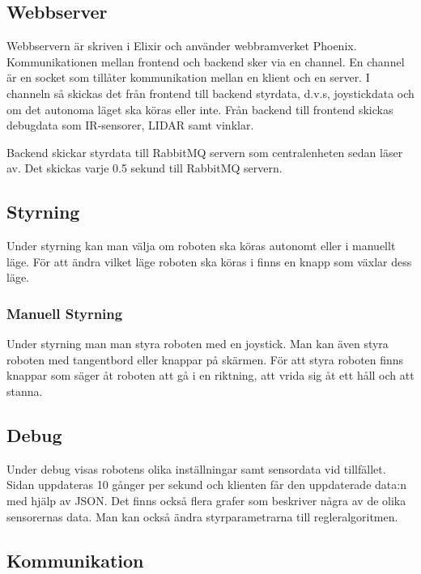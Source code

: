\documentclass[a4paper,titlepage,12pt]{article}
\begin{document}
	\subsection{Webbserver}
	Webbservern är skriven i Elixir och använder webbramverket Phoenix.
    Kommunikationen mellan frontend och backend sker via en channel. En channel
    är en socket som tillåter kommunikation mellan en klient och en server. I
    channeln så skickas det från frontend till backend styrdata, d.v.s,
    joystickdata och om det autonoma läget ska köras eller inte. Från backend
    till frontend skickas debugdata som IR-sensorer, LIDAR samt vinklar.
	
	Backend skickar styrdata till RabbitMQ servern som centralenheten sedan
	läser av. Det skickas varje 0.5 sekund till RabbitMQ servern.

    \subsection{Styrning}
    Under styrning kan man välja om roboten ska köras autonomt eller i manuellt läge.
    För att ändra vilket läge roboten ska köras i finns en knapp som växlar dess läge.
    
    \subsubsection{Manuell Styrning}
    Under styrning man man styra roboten med en joystick. Man kan även
    styra roboten med tangentbord eller knappar på skärmen. För att styra
    roboten finns knappar som säger åt roboten att gå i en riktning,
    att vrida sig åt ett håll och att stanna.

    \subsection{Debug}
	Under debug visas robotens olika inställningar samt sensordata vid
    tillfället. Sidan uppdateras 10 gånger per sekund och klienten får den
    uppdaterade data:n med hjälp av JSON. Det finns också flera grafer
    som beskriver några av de olika sensorernas data. Man kan också ändra
    styrparametrarna till regleralgoritmen.

	\label{gui:kommunikation}
    \subsection{Kommunikation}
\end{document}
